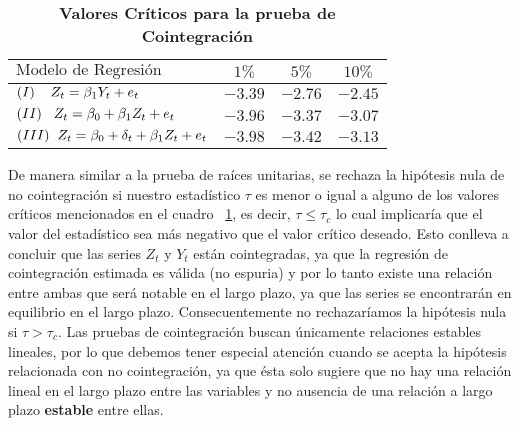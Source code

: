 \begin{table}[ht]
\caption{\textbf{Valores Críticos para la prueba de Cointegración}}
\label{table:CVC}
\centering
   \begin{tabular}{lccc}
    \firsthline
    $\mbox{Modelo de Regresión}$                                               &  $1\%$    &  $5\%$    & $10\%$   \\
   \hline
    $(I) \hspace{4mm}Z_t =\beta_1 Y_{t} + e_t$                     		&  $-3.39$ 	&	 $-2.76$ 	& 	$-2.45$ \\
    $(II) \hspace{3mm}Z_t = \beta_0 + \beta_1Z_{t} + e_t$            	&  $-3.96$ 	& 	$-3.37$ 	& 	$-3.07$ \\
    $(III)\hspace{2mm} Z_t = \beta_0 + \delta_t + \beta_1Z_{t}  + e_t$ 	& $-3.98$ 	& 	$-3.42$ 	&	 $-3.13$ \\
    \hline
    \end{tabular}
\end{table}
 
 \bigskip


De manera similar a la prueba de raíces unitarias, se rechaza la hipótesis nula de no cointegración si nuestro estadístico $\tau$ es menor 
o igual a alguno de los valores críticos mencionados en el cuadro ~\ref{table:CVC}, es decir, $\tau \leq \tau_c$ lo cual implicaría que el valor del estadístico sea más negativo que el valor crítico deseado. Esto conlleva a concluir que las series $Z_t$ y $Y_t$ están cointegradas, ya que la regresión de cointegración estimada es válida (no espuria) y por lo tanto existe una relación entre ambas que será notable en el largo plazo, ya que las series se encontrarán en equilibrio  en el largo plazo.  Consecuentemente no rechazaríamos la hipótesis nula si $\tau > \tau_c$. Las pruebas de cointegración buscan únicamente relaciones estables lineales, por lo que debemos tener especial atención cuando se acepta la hipótesis relacionada con no cointegración, ya que ésta solo sugiere que no hay una relación lineal en el largo plazo entre las variables y no ausencia de una relación a largo plazo \textbf{estable} entre ellas.\bigskip


